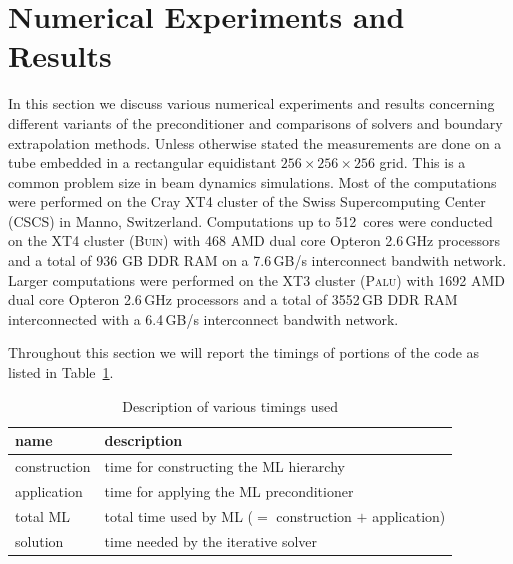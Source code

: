 \section{Numerical Experiments and Results}
\label{sec:results}

In this section we discuss various numerical experiments and results
concerning different variants of the preconditioner and comparisons of
solvers and boundary extrapolation methods.  Unless otherwise stated the
measurements are done on a tube embedded in a rectangular equidistant
$256\times256\times256$ grid.  This is a common problem size in beam
dynamics simulations.  Most of the computations were performed on the
Cray XT4 cluster of the Swiss Supercomputing Center (CSCS) in Manno,
Switzerland. Computations up to 512~cores were conducted on the XT4
cluster (\textsc{Buin}) with 468 AMD dual core Opteron 2.6\,GHz
processors and a total of 936 GB DDR RAM on a 7.6\,GB/s interconnect
bandwith network.  Larger computations were performed on the XT3 cluster
(\textsc{Palu}) with 1692 AMD dual core Opteron 2.6\,GHz processors and a
total of 3552\,GB DDR RAM interconnected with a 6.4\,GB/s interconnect
bandwith network.

Throughout this section we will report the timings of portions of the
code as listed in Table~\ref{tbl:timings_description}.
\begin{table}[ht]
  \begin{center}
    \begin{tabular}{ll}
      \hline
      name & description \\
      \hline
      construction & time for constructing the ML hierarchy \\
      application  & time for applying the ML preconditioner \\
      total ML     & total time used by ML ($=$ construction $+$ application) \\
      solution     & time needed by the iterative solver \\
      \hline
    \end{tabular}
    \caption{Description of various timings used}
    \label{tbl:timings_description}
  \end{center}
\end{table}

